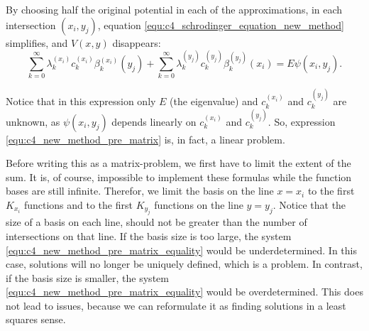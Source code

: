 By choosing half the original potential in each of the approximations, in each intersection $(x_i, y_j)$, equation \eqref{equ:c4_schrodinger_equation_new_method} simplifies, and $V(x, y)$ disappears:
\begin{equation}\label{equ:c4_new_method_pre_matrix}
    \sum_{k=0}^\infty \lambda_k^{(x_i)} c_k^{(x_i)} \beta^{(x_i)}_k(y_j) + \sum_{k=0}^\infty \lambda_k^{(y_j)} c_k^{(y_j)} \beta_k^{(y_j)}(x_i) = E \psi(x_i, y_j) \text{.}
\end{equation}

Notice that in this expression only $E$ (the eigenvalue) and $c_k^{(x_i)}$ and $c_k^{(y_j)}$ are unknown, as $\psi(x_i, y_j)$ depends linearly on $c_k^{(x_i)}$ and $c_k^{(y_j)}$. So, expression \eqref{equ:c4_new_method_pre_matrix} is, in fact, a linear problem.

Before writing this as a matrix-problem, we first have to limit the extent of the sum. It is, of course, impossible to implement these formulas while the function bases are still infinite. Therefor, we limit the basis on the line $x = x_i$ to the first $K_{x_i}$ functions and to the first $K_{y_j}$ functions on the line $y = y_j$. Notice that the size of a basis on each line, should not be greater than the number of intersections on that line. If the basis size is too large, the system \eqref{equ:c4_new_method_pre_matrix_equality} would be underdetermined. In this case, solutions will no longer be uniquely defined, which is a problem. In contrast, if the basis size is smaller, the system \eqref{equ:c4_new_method_pre_matrix_equality} would be overdetermined. This does not lead to issues, because we can reformulate it as finding solutions in a least squares sense.


